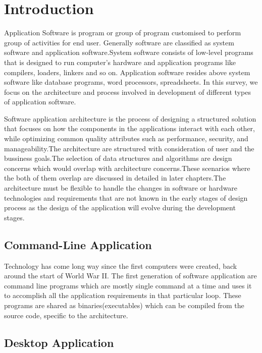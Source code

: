 \chapter{Introduction}\label{ch:introduction}
		Application	Software is program or group of program customised to perform group of activities for end user. Generally software are classified as system software and application software.System software consists of low-level programs that is designed to run computer's hardware and application programs like compilers, loaders, linkers and so on. Application software resides above system software like database programs, word processors, spreadsheets. In this survey, we focus on the architecture and process involved in development of different types of application software. 

		Software application architecture is the process of designing a structured solution that focuses on how the components in the applications interact with each other, while optimizing common quality attributes such as performance, security, and manageability.The architecture are structured with consideration of user and the bussiness goals.The selection of data structures and algorithms are design concerns which would overlap with architecture concerns.These scenarios where the both of them overlap are discussed in detailed in later chapters.The architecture must be flexible to handle the changes in software or hardware technologies and requirements that are not known in the early stages of design process as the design of the application will evolve during the development stages.
			
	
\section{Command-Line Application}
			
			Technology has come long way since the first computers were created, back around the start of World War II. The first generation of software application are command line programs which are mostly single command at a time and uses it to accomplish all the application requirements in that particular loop. These programs are shared as binaries(executables) which can be compiled from the source code, specific to the architecture. 

\section{Desktop Application}
			
